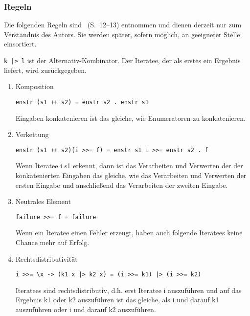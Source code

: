 \documentclass[draft=false
              ,paper=a4
              ,twoside=false
              ,fontsize=11pt
              ,headsepline
              ,BCOR10mm
              ,DIV11
              ]{scrbook}
\begin{document}


\subsubsection{Regeln} %
\label{ssub:regeln}

Die folgenden Regeln sind \citealt{kiselyov2012}~(S.~12--13) entnommen und dienen derzeit nur zum Verständnis des Autors.
Sie werden später, sofern möglich, an geeigneter Stelle einsortiert.

\lstinline!k |> l! ist der Alternativ-Kombinator. Der Iteratee, der als erstes ein Ergebnis liefert, wird zurückgegeben.

\begin{enumerate}
  \item Komposition
    \begin{lstlisting}
enstr (s1 ++ s2) = enstr s2 . enstr s1
    \end{lstlisting}

    Eingaben konkatenieren ist das gleiche, wie Enumeratoren zu konkatenieren.

  \item Verkettung
    \begin{lstlisting}
enstr (s1 ++ s2)(i >>= f) = enstr s1 i >>= enstr s2 . f
    \end{lstlisting}

    Wenn Iteratee i s1 erkennt, dann ist das Verarbeiten und Verwerten der der konkatenierten Eingaben das gleiche, wie das Verarbeiten und Verwerten der ersten Eingabe und anschließend das Verarbeiten der zweiten Eingabe.

  \item Neutrales Element
    \begin{lstlisting}
failure >>= f = failure
    \end{lstlisting}

    Wenn ein Iteratee einen Fehler erzeugt, haben auch folgende Iteratees keine Chance mehr auf Erfolg.

  \item Rechtsdistributivität
    \begin{lstlisting}
i >>= \x -> (k1 x |> k2 x) = (i >>= k1) |> (i >>= k2)
    \end{lstlisting}

    Iteratees sind rechtsdistributiv, d.h. erst Iteratee i auszuführen und auf das Ergebnis k1 oder k2 auszuführen ist das gleiche, als i und darauf k1 auszuführen oder i und darauf k2 auszuführen.
\end{enumerate}
\end{document}
